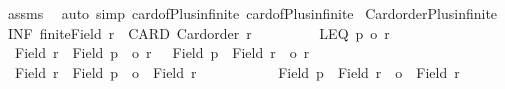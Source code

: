 \begin{isabellebody}
%
\isadelimproof
%
\endisadelimproof
%
\isatagproof
{}\isamarkupfalse%
\ assms\ \isamarkupfalse%
\ {\isacharparenleft}{\kern0pt}auto\ simp{\isacharcolon}{\kern0pt}\ card{\isacharunderscore}{\kern0pt}of{\isacharunderscore}{\kern0pt}Plus{\isacharunderscore}{\kern0pt}infinite{}\ card{\isacharunderscore}{\kern0pt}of{\isacharunderscore}{\kern0pt}Plus{\isacharunderscore}{\kern0pt}infinite{}{\isacharparenright}{\kern0pt}%
\endisatagproof
{\isafoldproof}%
%
\isadelimproof
\isanewline
%
\endisadelimproof
\isanewline
{}\isamarkupfalse%
\ Card{\isacharunderscore}{\kern0pt}order{\isacharunderscore}{\kern0pt}Plus{\isacharunderscore}{\kern0pt}infinite{\isacharcolon}{\kern0pt}\isanewline
{}\ INF{\isacharcolon}{\kern0pt}\ {\isachardoublequoteopen}{\isasymnot}finite{\isacharparenleft}{\kern0pt}Field\ r{\isacharparenright}{\kern0pt}{\isachardoublequoteclose}\ \ CARD{\isacharcolon}{\kern0pt}\ {\isachardoublequoteopen}Card{\isacharunderscore}{\kern0pt}order\ r{\isachardoublequoteclose}\ \isanewline
\ \ \ \ \ \ \ \ LEQ{\isacharcolon}{\kern0pt}\ {\isachardoublequoteopen}p\ {\isasymle}o\ r{\isachardoublequoteclose}\isanewline
{}\ {\isachardoublequoteopen}{\isacharbar}{\kern0pt}\ {\isacharparenleft}{\kern0pt}Field\ r{\isacharparenright}{\kern0pt}\ {\isacharless}{\kern0pt}{\isacharplus}{\kern0pt}{\isachargreater}{\kern0pt}\ {\isacharparenleft}{\kern0pt}Field\ p{\isacharparenright}{\kern0pt}\ {\isacharbar}{\kern0pt}\ {\isacharequal}{\kern0pt}o\ r\ {\isasymand}\ {\isacharbar}{\kern0pt}\ {\isacharparenleft}{\kern0pt}Field\ p{\isacharparenright}{\kern0pt}\ {\isacharless}{\kern0pt}{\isacharplus}{\kern0pt}{\isachargreater}{\kern0pt}\ {\isacharparenleft}{\kern0pt}Field\ r{\isacharparenright}{\kern0pt}\ {\isacharbar}{\kern0pt}\ {\isacharequal}{\kern0pt}o\ r{\isachardoublequoteclose}\isanewline
%
\isadelimproof
%
\endisadelimproof
%
\isatagproof
{}\isamarkupfalse%
{\isacharminus}{\kern0pt}\isanewline
\ \ \isamarkupfalse%
\ {\isachardoublequoteopen}{\isacharbar}{\kern0pt}\ Field\ r\ {\isacharless}{\kern0pt}{\isacharplus}{\kern0pt}{\isachargreater}{\kern0pt}\ Field\ p\ {\isacharbar}{\kern0pt}\ {\isacharequal}{\kern0pt}o\ {\isacharbar}{\kern0pt}\ Field\ r\ {\isacharbar}{\kern0pt}\ {\isasymand}\isanewline
\ \ \ \ \ \ \ \ {\isacharbar}{\kern0pt}\ Field\ p\ {\isacharless}{\kern0pt}{\isacharplus}{\kern0pt}{\isachargreater}{\kern0pt}\ Field\ r\ {\isacharbar}{\kern0pt}\ {\isacharequal}{\kern0pt}o\ {\isacharbar}{\kern0pt}\ Field\ r\ {\isacharbar}{\kern0pt}{\isachardoublequoteclose}\isanewline

\end{isabellebody}
